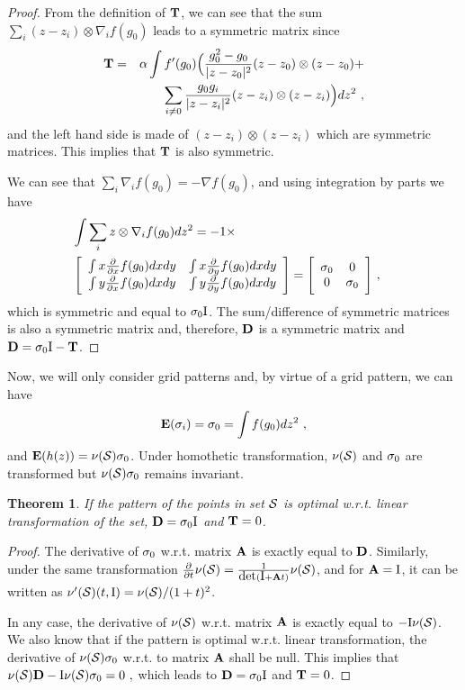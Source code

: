 \documentclass[12pt,english]{article}
\newtheorem{theorem}{Theorem}[section]
\begin{document}
\begin{proof}
From the definition of $\BT$, we can see that the sum \mbox{$\sum_i (z-z_i)\otimes \nabla_i f(g_0)$} leads to a symmetric matrix since
\begin{eqnarray*}
\BT&=&\alpha\int f'(g_0)\Big(\frac{g_0^2-g_0}{|z-z_0|^2}(z-z_0)\otimes(z-z_0)+\\
&&\sum_{i\neq 0}\frac{g_0g_i}{|z-z_i|^2}(z-z_i)\otimes(z-z_i)\Big)dz^2~,
\end{eqnarray*}
and the left hand side is made of \mbox{$(z-z_i)\otimes(z-z_i)$} which are symmetric matrices. This implies that $\BT$ is also symmetric.

We can see that \mbox{$\sum_{i}\nabla_i f(g_0)=-\nabla f(g_0)$}, and using integration by parts we have
\begin{eqnarray*}
\lefteqn{\int \sum_i z\otimes \nabla_i f(g_0)dz^2=-1\times}\\
&\Biggl[
\begin{array}{cc}
\int x \fpx f(g_0)dxdy&\int x \fpy f(g_0)dxdy\\
\int y \fpx f(g_0)dxdy&\int y \fpy f(g_0)dxdy
\end{array}
\Biggr]=
\Biggl[\begin{array}{cc}
\ss_0&0\\
0&\ss_0
\end{array}\Biggr]~,\end{eqnarray*}
which is symmetric and equal to $\ss_0\BI$. The sum/difference of symmetric matrices is also a symmetric matrix and, therefore, $\BD$ is a symmetric matrix and $\BD=\ss_0\BI-\BT$. 
\end{proof}



Now, we will only consider grid patterns and, by virtue of a grid pattern, we can have 
$$
\E(\ss_i)=\ss_0=\int f(g_0)dz^2~,
$$ 
and \mbox{$\E(h(z))=\nu({\cal S})\ss_0$}. Under homothetic transformation, $\nu({\cal S})$ and $\ss_0$ are transformed but $\nu({\cal S})\ss_0$ remains invariant.

\begin{theorem}
If the pattern of the points in set ${\cal S}$ is optimal w.r.t. linear transformation of the set, $\BD=\ss_0\BI$ and $\BT=0$.
\end{theorem}

\begin{proof}
The derivative of $\ss_0$ w.r.t. matrix $\BA$ is exactly equal to $\BD$. 
Similarly, under the same transformation
$
\frac{\partial}{\partial t}\nu({\cal S})=\frac{1}{\det(\BI+\BA t)}\nu({\cal S})
$,
and for $\BA=\BI$, it can be written as $\nu'({\cal S})(t,\BI)=\nu({\cal S})/(1+t)^2$.

In any case, the derivative of $\nu({\cal S})$ w.r.t. matrix $\BA$ is exactly equal to $-\BI\nu({\cal S})$. 
We also know that if the pattern is optimal w.r.t. linear transformation, the derivative of $\nu({\cal S})\ss_0$ w.r.t. to matrix $\BA$ shall be null. This implies that
$
\nu({\cal S})\BD-\BI\nu({\cal S})\ss_0=0~,
$
which leads to $\BD=\ss_0\BI$ and $\BT=0$.
\end{proof}
\end{document}
